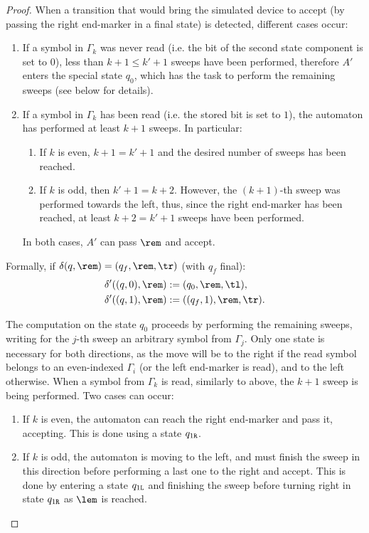 \begin{proof}
	When a transition that would bring the simulated device to accept (by passing the right end-marker in a final state) is detected, different cases occur:
	\begin{enumerate}
		\item If a symbol in $\Gamma_k$ was never read (i.e. the bit of the second state component is set to $0$), less than $k+1\le k'+1$ sweeps have been performed, therefore $A'$ enters the special state $q_0$, which has the task to perform the remaining sweeps (see below for details).
		\item If a symbol in $\Gamma_k$ has been read (i.e. the stored bit is set to $1$), the automaton has performed at least $k+1$ sweeps. In particular:
		      \begin{enumerate}
			      \item If $k$ is even, $k+1=k'+1$ and the desired number of sweeps has been reached.
			      \item If $k$ is odd, then $k'+1=k+2$. However, the $(k+1)$-th sweep was performed towards the left, thus, since the right end-marker has been reached, at least $k+2=k'+1$ sweeps have been performed.
		      \end{enumerate}
		      In both cases, $A'$ can pass $\rem$ and accept.
	\end{enumerate}

	Formally, if $\delta(q,\rem)=(q_f,\rem,\tr)$ (with $q_f$ final):
	\begin{align*}
		\delta'((q,0),\rem) & := (q_0,\rem,\tl) \text,     \\
		\delta'((q,1),\rem) & := ((q_f,1),\rem,\tr) \text.
	\end{align*}

	The computation on the state $q_0$ proceeds by performing the remaining sweeps, writing for the $j$-th sweep an arbitrary symbol from $\Gamma_j$.
	Only one state is necessary for both directions, as the move will be to the right if the read symbol belongs to an even-indexed $\Gamma_i$ (or the left end-marker is read), and to the left otherwise.
	When a symbol from $\Gamma_k$ is read, similarly to above, the $k+1$ sweep is being performed. Two cases can occur:
	\begin{enumerate}
		\item If $k$ is even, the automaton can reach the right end-marker and pass it, accepting. This is done using a state $q_{1\mathtt{R}}$.
		\item If $k$ is odd, the automaton is moving to the left, and must finish the sweep in this direction before performing a last one to the right and accept. This is done by entering a state $q_{1\mathtt{L}}$ and finishing the sweep before turning right in state $q_{1\mathtt{R}}$ as $\lem$ is reached.
	\end{enumerate}


\end{proof}
